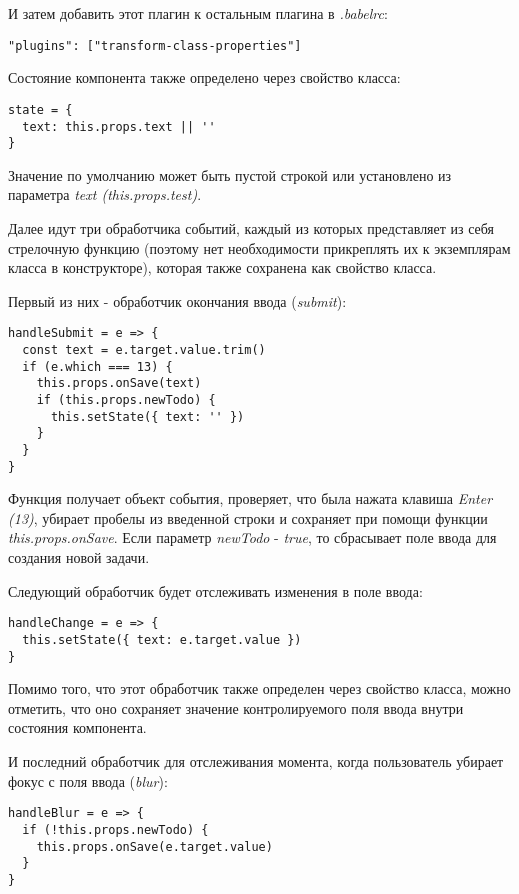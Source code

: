 И затем добавить этот плагин к остальным плагина в \textit{.babelrc}:

\begin{lstlisting}
"plugins": ["transform-class-properties"]
\end{lstlisting}

Состояние компонента также определено через свойство класса:

\begin{lstlisting}
state = {
  text: this.props.text || ''
}
\end{lstlisting}

Значение по умолчанию может быть пустой строкой или установлено из параметра \textit{text (this.props.test)}.

Далее идут три обработчика событий, каждый из которых представляет из себя стрелочную функцию (поэтому нет необходимости прикреплять их к экземплярам класса в конструкторе), которая также сохранена как свойство класса. 

Первый из них - обработчик окончания ввода (\textit{submit}):

\begin{lstlisting}
handleSubmit = e => {
  const text = e.target.value.trim()
  if (e.which === 13) {
    this.props.onSave(text)
    if (this.props.newTodo) {
      this.setState({ text: '' })
    }
  }
}
\end{lstlisting}

Функция получает объект события, проверяет, что была нажата клавиша \textit{Enter (13)}, убирает пробелы из введенной строки и сохраняет при помощи функции \textit{this.props.onSave}. Если параметр \textit{newTodo} - \textit{true}, то сбрасывает поле ввода для создания новой задачи.

Следующий обработчик будет отслеживать изменения в поле ввода:

\begin{lstlisting}
handleChange = e => {
  this.setState({ text: e.target.value })
}
\end{lstlisting}

Помимо того, что этот обработчик также определен через свойство класса, можно отметить, что оно сохраняет значение контролируемого поля ввода внутри состояния компонента.

И последний обработчик для отслеживания момента, когда пользователь убирает фокус с поля ввода (\textit{blur}):

\begin{lstlisting}
handleBlur = e => {
  if (!this.props.newTodo) {
    this.props.onSave(e.target.value)
  }
}
\end{lstlisting}

